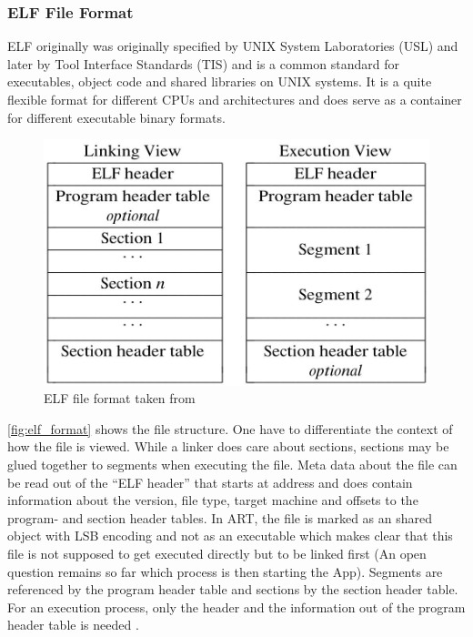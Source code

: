 \subsubsection{ELF File Format}\label{section:elf_file_format}
ELF originally was originally specified by UNIX System Laboratories
(USL) and later by Tool Interface Standards (TIS) and is a common
standard for executables, object code and shared libraries on UNIX
systems. It is a quite flexible format for different CPUs and
architectures and does serve as a container for different
executable binary formats.

\begin{figure}[htb]
  \centering
  \includegraphics[scale=0.4]{figures/elf_format}
  \caption[ELF file format]{ELF file format taken from \parencite{portable_formats_spec}}
  \label{fig:elf_format}
\end{figure}

\autoref{fig:elf_format} shows the file structure.
One have to differentiate the context of how the file is viewed.
While a linker does care about sections, sections may be
glued together to segments when executing the file.
Meta data about the file can be read out of the ``ELF header''
that starts at address  and does contain
information about the version, file type, target machine and
offsets to the program- and section header tables.
In ART, the file is marked as an shared object with LSB encoding
and not as an executable which makes clear that this file is not
supposed to get executed directly but to be linked first
(An open question remains so far which process is then starting
the App).
Segments are referenced by the program header table and sections
by the section header table. For an execution process, only the header
and the information out of the program header table is needed
\parencite{life_of_binaries}.

